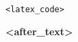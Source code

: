\documentclass[varwidth,convert]{standalone}
\begin{document}
\begin{lstlisting}[language=<lang>]
<latex_code>
\end{lstlisting}

\textbf{<after_text>}
\end{document}
